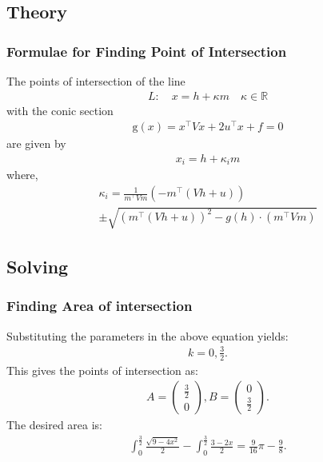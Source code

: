 \documentclass{beamer}
\providecommand{\brak}[1]{\ensuremath{\left(#1\right)}}
\theoremstyle{remark}
\newcommand{\myvec}[1]{\ensuremath{\begin{pmatrix}#1\end{pmatrix}}}
\begin{document}
\subsection{Theory}
\begin{frame}
\frametitle{Formulae for Finding Point of Intersection}
The points of intersection of the line 
\begin{align}
L: \quad x = h + \kappa m \quad \kappa \in \mathbb{R}
\end{align}
with the conic section 
\begin{align}
    \text{g}\brak{x} = x^{\top}Vx + 2u^{\top}x + f = 0
\end{align}
are given by
\begin{align}
x_i = h + \kappa_i m
\end{align}
where,
\begin{multline}
\kappa_i = \frac{1}{m^{\top}Vm} \left( -m^{\top}(Vh+u) \right) \\
\pm \sqrt{
\left( m^{\top}(Vh+u) \right)^2 - g(h) \cdot (m^{\top}Vm)
}
\end{multline}
\end{frame}
\subsection{Solving}
\begin{frame}
\frametitle{Finding Area of intersection}
Substituting the parameters in the above equation yields:
\begin{align}
    k=0,\frac{3}{2}.
\end{align}
This gives the points of intersection as:
\begin{align}
    A=\myvec{\frac{3}{2}\\0}, B=\myvec{0\\ \frac{3}{2}}.
\end{align}
The desired area is:
\begin{align}
\int_{0}^{\frac{3}{2}}\frac{\sqrt{9-4x^2}}{2}-\int_{0}^{\frac{3}{2}}\frac{3-2x}{2}=\frac{9}{16}\pi-\frac{9}{8}.
\end{align}
\end{frame}
\end{document}
